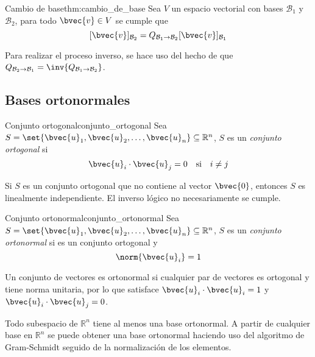 \documentclass{fmbnotes}
\begin{document}
\begin{teorema}{Cambio de base}{thm:cambio_de_base}
	Sea \(V\) un espacio vectorial con bases \(\mathcal{B}_1\) y \(\mathcal{B}_2\), para todo \(\bvec{v} \in V\) se cumple que
	\[[\bvec{v}]_{\mathcal{B}_2}=Q_{\mathcal{B}_1\to \mathcal{B}_2}[\bvec{v}]_{\mathcal{B}_1}\]
\end{teorema}

Para realizar el proceso inverso, se hace uso del hecho de que \(Q_{\mathcal{B}_2\to \mathcal{B}_1}=\inv{Q_{\mathcal{B}_1\to \mathcal{B}_2}}\).

\subsection{Bases ortonormales}

\begin{definicion}{Conjunto ortogonal}{conjunto_ortogonal}
	Sea \(S=\set{\bvec{u}_1,\bvec{u}_2,\ldots,\bvec{u}_n}\subseteq\mathbb{R}^{n}\), \(S\) es un \emph{conjunto ortogonal} si
	\[\bvec{u}_i \cdot \bvec{u}_j=0 \quad\text{si}\quad i \neq j\]
\end{definicion}
Si \(S\) es un conjunto ortogonal que no contiene al vector  \(\bvec{0}\), entonces \(S\) es linealmente independiente. El inverso lógico no necesariamente se cumple.

\begin{definicion}{Conjunto ortonormal}{conjunto_ortonormal}
	Sea \(S=\set{\bvec{u}_1,\bvec{u}_2,\ldots,\bvec{u}_n}\subseteq\mathbb{R}^{n}\), \(S\) es un \emph{conjunto ortonormal} si es un conjunto ortogonal y 
	\[ \norm{\bvec{u}_i}=1\]
\end{definicion}
Un conjunto de vectores es ortonormal si cualquier par de vectores es ortogonal y tiene norma unitaria, por lo que satisface \( \bvec{u}_i \cdot \bvec{u}_i=1 \) y \( \bvec{u}_i \cdot \bvec{u}_j=0 \).

Todo subespacio de \(\mathbb{R}^{n}\) tiene al menos una base ortonormal. A partir de cualquier base en \(\mathbb{R}^{n}\) se puede obtener una base ortonormal haciendo uso del algoritmo de Gram-Schmidt seguido de la normalización de los elementos.

\end{document}
